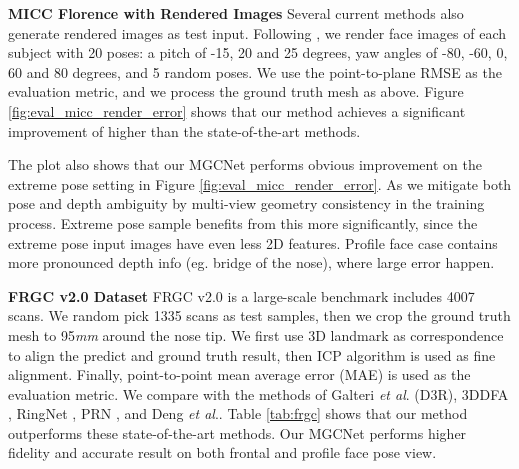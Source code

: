 \documentclass[runningheads]{llncs}
\newcommand{\etal}{\textit{et al}.}
\begin{document}
\noindent
\textbf{MICC Florence with Rendered Images}
Several current methods \cite{unsuper_mul_ng2019accurate,super_fit_yi2019mmface,super_fit_volu_exp_feng2018joint,super_fit_volu_jackson2017large} also generate rendered images as test input.
Following \cite{unsuper_mul_ng2019accurate,super_fit_yi2019mmface,super_fit_volu_exp_feng2018joint,super_fit_volu_jackson2017large}, we render face images of each subject with 20 poses: a pitch of -15, 20 and 25 degrees, yaw angles of -80, -60, 0, 60 and 80 degrees, and 5 random poses. We use the point-to-plane RMSE as the evaluation metric, and we process the ground truth mesh as above.
Figure \ref{fig:eval_micc_render_error} shows that our method achieves a significant improvement of  higher than the state-of-the-art methods. 

The plot also shows that our MGCNet performs obvious improvement on the extreme pose setting  in Figure \ref{fig:eval_micc_render_error}. As we mitigate both pose and depth ambiguity by multi-view geometry consistency in the training process. Extreme pose sample benefits from this more significantly, since the extreme pose input images have even less 2D features. Profile face case contains more pronounced depth info (eg. bridge of the nose), where large error happen.


\noindent
\textbf{FRGC v2.0 Dataset}
FRGC v2.0 is a large-scale benchmark includes 4007 scans. We random pick 1335 scans as test samples, then we crop the ground truth mesh to 95\textit{mm} around the nose tip. We first use 3D landmark as correspondence to align the predict and ground truth result, then ICP algorithm is used as fine alignment. Finally, point-to-point mean average error (MAE) is used as the evaluation metric.
We compare with the methods of Galteri \etal \cite{super_review3_galteri2019deep} (D3R), 3DDFA \cite{dataset_aflw20003D_300WLP_zhu2016face}, RingNet \cite{unsuper_mul_sanyal2019learning_ring}, PRN \cite{super_fit_volu_exp_feng2018joint}, and Deng \etal \cite{unsuper_mul_ng2019accurate}. 
Table \ref{tab:frgc} shows that our method outperforms these state-of-the-art methods. Our MGCNet performs higher fidelity and accurate result on both frontal and profile face pose view.
\end{document}
